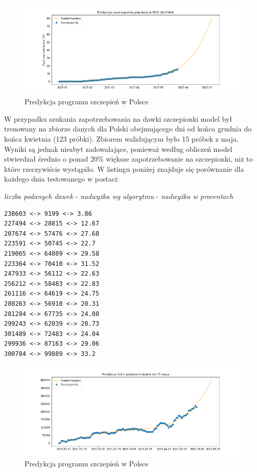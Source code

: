 \documentclass[12pt, oneside]{article}
\begin{document}
\begin{figure}[h!]
\centering
\includegraphics[height=0.25\textheight]{../img/PL_predict.png} 
\caption{Predykcja programu szczepień w Polsce}
\end{figure}

W przypadku szukania zapotrzebowania na dawki szczepionki model był trenowany na zbiorze danych dla Polski obejmującego dni od końca grudnia do końca kwietnia (123 próbki). Zbiorem walidującym było 15 próbek z maja. Wyniki są jednak niezbyt zadowalające, ponieważ według obliczeń model stwierdzał średnio o ponad 20\% większe zapotrzebowanie na szczepionki, niż to które rzeczywiście wystąpiło. W listingu poniżej znajduje się porównanie dla każdego dnia testowanego w postaci:

 \textit{liczba podanych dawek} - \textit{nadwyżka wg algorytmu} - \textit{nadwyżka w procentach}

\begin{Verbatim}[tabsize=4]
238603 <-> 9199 <-> 3.86
227494 <-> 28815 <-> 12.67
207674 <-> 57476 <-> 27.68
223591 <-> 50745 <-> 22.7
219065 <-> 64809 <-> 29.58
223364 <-> 70410 <-> 31.52
247933 <-> 56112 <-> 22.63
256212 <-> 58483 <-> 22.83
261116 <-> 64619 <-> 24.75
280263 <-> 56910 <-> 20.31
281284 <-> 67735 <-> 24.08
299243 <-> 62039 <-> 20.73
301489 <-> 72483 <-> 24.04
299936 <-> 87163 <-> 29.06
300784 <-> 99889 <-> 33.2
\end{Verbatim}

\begin{figure}[h!]
\centering
\includegraphics[height=0.25\textheight]{../img/demand1.png} 
\caption{Predykcja programu szczepień w Polsce}
\label{Rys:boxplotSamples}
\end{figure}
\end{document}
